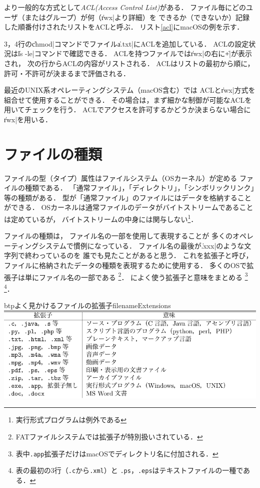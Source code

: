 より一般的な方式として\emph{ACL(Access Control List)}がある．
ファイル毎にどのユーザ（またはグループ）が何（\|rwx|より詳細）を
できるか（できないか）記録した順番付けされたリストをACLと呼ぶ．
リスト\ref{acl}にmacOSの例を示す．



3，4行の\|chmod|コマンドでファイル\|a.txt|にACLを追加している．
ACLの設定状況は\|ls -le|コマンドで確認できる．
ACLを持つファイルでは\|rwx|の右に\|+|が表示され，
次の行からACLの内容がリストされる．
ACLはリストの最初から順に，
許可・不許可が決まるまで評価される．

最近のUNIX系オペレーティングシステム（macOS含む）では
ACLと\|rwx|方式を組合せて使用することができる．
その場合は，まず細かな制御が可能なACLを用いてチェックを行う．
ACLでアクセスを許可するかどうか決まらない場合に\|rwx|を用いる．

\section{ファイルの種類}
ファイルの型（タイプ）属性はファイルシステム（OSカーネル）が定める
ファイルの種類である．
「通常ファイル」，「ディレクトリ」，「シンボリックリンク」等の種類がある．
型が「通常ファイル」のファイルにはデータを格納することができる．
OSカーネルは通常ファイルのデータがバイトストリームであることは定めているが，
バイトストリームの中身には関与しない\footnote{実行形式プログラムは例外である}．

ファイルの種類は，
ファイル名の一部を使用して表現することが
多くのオペレーティングシステムで慣例になっている．
ファイル名の最後が\|.xxx|のような文字列で終わっているのを
誰でも見たことがあると思う．
これを拡張子と呼び，ファイルに格納されたデータの種類を表現するために使用する．
多くのOSで拡張子は単にファイル名の一部である
\footnote{FATファイルシステムでは拡張子が特別扱いされている．}．
によく使う拡張子と意味をまとめる
\footnote{表中\texttt{.app}拡張子だけはmacOSでディレクトリ名に付加される．}
\footnote{表の最初の3行（\texttt{.c}から\texttt{.xml}）と
  \texttt{.ps}，\texttt{.eps}はテキストファイルの一種である．}．

\begin{mytable}{btp}{よく見かけるファイルの拡張子}{filenameExtensions}
  \includegraphics[scale=1.0]{Tbl/filenameExtensions.pdf}
\end{mytable}

